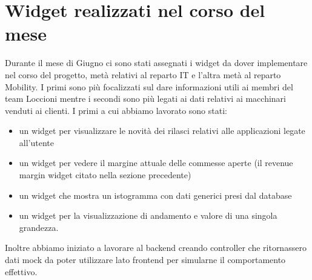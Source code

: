 \section{Widget realizzati nel corso del mese}

Durante il mese di Giugno ci sono stati assegnati i widget da dover implementare nel corso del progetto, metà relativi al reparto IT e l'altra metà al reparto Mobility. I primi sono più focalizzati sul dare informazioni utili ai membri del team Loccioni mentre i secondi sono più legati ai dati relativi ai macchinari venduti ai clienti. I primi a cui abbiamo lavorato sono stati: 
\begin{itemize}
\item 
un widget per visualizzare le novità dei rilasci relativi alle applicazioni legate all'utente
\item 
un widget per vedere il margine attuale delle commesse aperte (il revenue margin widget citato nella sezione precedente)
\item 
un widget che mostra un istogramma con dati generici presi dal database
\item 
un widget per la visualizzazione di andamento e valore di una singola grandezza.
\end{itemize}
Inoltre abbiamo iniziato a lavorare al backend creando controller che ritornassero dati mock da poter utilizzare lato frontend per simularne il comportamento effettivo. 
